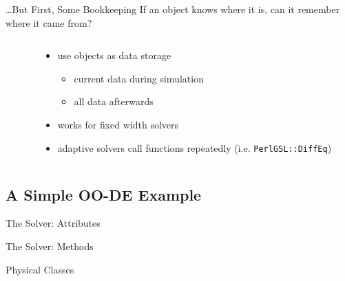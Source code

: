 \documentclass[mathserif]{beamer}
\providecommand{\code}[1]{{\texttt{\scriptsize{#1}}}}
\begin{document}
\begin{frame}{\ldots But First, Some Bookkeeping}
  If an object knows where it is, can it remember where it came from?
  \begin{columns}
    \begin{column}{0.49\linewidth}
      \begin{block}{}
        \scriptsize
        
      \end{block}
    \end{column}
    \begin{column}{0.49\linewidth}
      \begin{itemize}
        \item<2-> use objects as data storage
        \begin{itemize}
          \item<3-> current data during simulation
          \item<4-> all data afterwards
        \end{itemize}
        \item<5-> works for fixed width solvers
        \item<6-> adaptive solvers call functions repeatedly (i.e. \code{PerlGSL::DiffEq})
      \end{itemize}
    \end{column}
  \end{columns}
\end{frame}

\subsection{A Simple OO-DE Example}

\begin{frame}{The Solver: Attributes}
  \begin{block}{}
    \scriptsize
    
  \end{block}
\end{frame}

\begin{frame}{The Solver: Methods}
  \begin{block}{}
    \scriptsize
    
  \end{block}
\end{frame}

\begin{frame}{Physical Classes}
  \begin{block}{}
    \scriptsize
    
  \end{block}
\end{frame}
\end{document}
